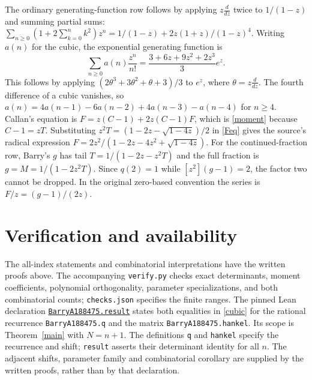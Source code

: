 \documentclass[11pt]{article}
\begin{document}
\noindent The ordinary generating-function row follows by applying
$z\frac{d}{dz}$ twice to $1/(1-z)$ and summing partial sums:
$\sum_{n\geq0}(1+2\sum_{k=0}^nk^2)z^n
=1/(1-z)+2z(1+z)/(1-z)^4$.
Writing $a(n)$ for the cubic, the exponential generating function is
\[
\sum_{n\geq0}a(n)\frac{z^n}{n!}
 =\frac{3+6z+9z^2+2z^3}{3}e^z.
\]
This follows by applying $(2\theta^3+3\theta^2+\theta+3)/3$
to $e^z$, where $\theta=z\frac{d}{dz}$. The fourth difference
of a cubic vanishes, so
$a(n)=4a(n-1)-6a(n-2)+4a(n-3)-a(n-4)$ for $n\geq4$.
Callan's equation is $F=z(C-1)+2z(C-1)F$, which is
\eqref{moment} because $C-1=zT$. Substituting
$z^2T=(1-2z-\sqrt{1-4z})/2$ in \eqref{Feq} gives the
source's radical expression
$F=2z^2/(1-2z-4z^2+\sqrt{1-4z})$.
For the continued-fraction row, Barry's $g$ has tail
$T=1/(1-2z-z^2T)$ and the full fraction is
$g=M=1/(1-2z^2T)$. Since $q(2)=1$ while $[z^2](g-1)=2$,
the factor two cannot be dropped.
In the original zero-based convention the series is $F/z=(g-1)/(2z)$.

\section*{Verification and availability}
The all-index statements and combinatorial interpretations have the
written proofs above. The accompanying \texttt{verify.py} checks exact
determinants, moment coefficients, polynomial orthogonality, parameter
specializations, and both combinatorial counts; \texttt{checks.json}
specifies the finite ranges.
The pinned Lean declaration
\href{https://github.com/the-omega-institute/trureturing/blob/c6d80ec1ad5920a0470d7ff831c17f6303e6e578/D5/S3/Combinatorics/CatalanPowerHankel/BarryA188475.lean}{\texttt{BarryA188475.result}}
states both equalities in \eqref{cubic} for the rational recurrence
\texttt{BarryA188475.q} and the matrix \texttt{BarryA188475.hankel}.
Its scope is Theorem~\ref{main} with $N=n+1$. The definitions
\texttt{q} and \texttt{hankel} specify the recurrence and shift;
\texttt{result} asserts their determinant identity for all $n$.
The adjacent shifts, parameter family and combinatorial corollary
are supplied by the written proofs, rather than by that declaration.
\end{document}
